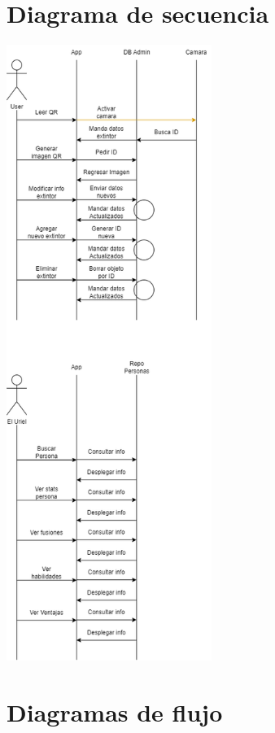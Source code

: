 \documentclass[a4paper,twoside,10pt]{report}
\begin{document}
\section{Diagrama de secuencia}


\includegraphics[width=0.50\textwidth]{Sequencia.png}


\section{Diagramas de flujo}
\end{document}
